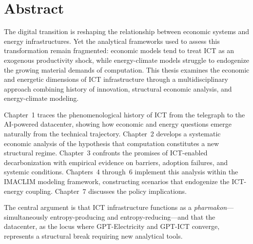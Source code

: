 
\chapter*{Abstract}

The digital transition is reshaping the relationship between economic systems and energy infrastructures. Yet the analytical frameworks used to assess this transformation remain fragmented: economic models tend to treat ICT as an exogenous productivity shock, while energy-climate models struggle to endogenize the growing material demands of computation. This thesis examines the economic and energetic dimensions of ICT infrastructure through a multidisciplinary approach combining history of innovation, structural economic analysis, and energy-climate modeling.

Chapter~1 traces the phenomenological history of ICT from the telegraph to the AI-powered datacenter, showing how economic and energy questions emerge naturally from the technical trajectory. Chapter~2 develops a systematic economic analysis of the hypothesis that computation constitutes a new structural regime. Chapter~3 confronts the promises of ICT-enabled decarbonization with empirical evidence on barriers, adoption failures, and systemic conditions. Chapters~4 through~6 implement this analysis within the IMACLIM modeling framework, constructing scenarios that endogenize the ICT-energy coupling. Chapter~7 discusses the policy implications.

The central argument is that ICT infrastructure functions as a \emph{pharmakon}---simultaneously entropy-producing and entropy-reducing---and that the datacenter, as the locus where GPT-Electricity and GPT-ICT converge, represents a structural break requiring new analytical tools.

\cleardoublepage

\renewcommand{\contentsname}{Contents}
\setcounter{tocdepth}{2}
\tableofcontents